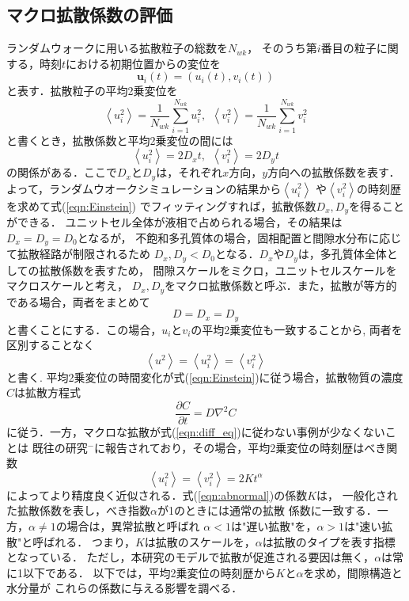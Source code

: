 \subsection{マクロ拡散係数の評価}
ランダムウォークに用いる拡散粒子の総数を$N_{wk}$，
そのうち第$i$番目の粒子に関する，時刻$t$における初期位置からの変位を
\begin{equation}
	\mathbf{u}_i(t)=\left(u_i(t),v_i(t)\right)
	\label{eqn:u_i}
\end{equation}
と表す．拡散粒子の平均2乗変位を
\begin{equation}
	\left< u_i^2 \right>=
	\frac{1}{N_{wk}} \sum_{i=1}^{N_{wk}}u_i^2
	, \ \ 
	\left< v_i^2 \right>=
	\frac{1}{N_{wk}} \sum_{i=1}^{N_{wk}}v_i^2
	\label{eqn:u2b}
\end{equation}
と書くとき，拡散係数と平均2乗変位の間には
\begin{equation}
	\left< u_i^2 \right>=2 D_{x} t, \ \ 
	\left< v_i^2 \right>=2 D_{y} t
	\label{eqn:Einstein}
\end{equation}
の関係がある．ここで$D_x$と$D_y$は，それぞれ$x$方向，$y$方向への拡散係数を表す．
よって，ランダムウオークシミュレーションの結果から$\left<u_i^2\right>$
や$\left<v_i^2\right>$の時刻歴を求めて式(\ref{eqn:Einstein})
でフィッティングすれば，拡散係数$D_x,D_y$を得ることができる．
ユニットセル全体が液相で占められる場合，その結果は$D_x=D_y=D_0$となるが，
不飽和多孔質体の場合，固相配置と間隙水分布に応じて拡散経路が制限されるため
$D_x,D_y<D_0$となる．$D_x$や$D_y$は，多孔質体全体としての拡散係数を表すため，
間隙スケールをミクロ，ユニットセルスケールをマクロスケールと考え，
$D_x,D_y$をマクロ拡散係数と呼ぶ．また，拡散が等方的である場合，両者をまとめて
\begin{equation}
	D=D_x=D_y
	\label{eqn:D_iso}
\end{equation}
と書くことにする．この場合，$u_i$と$v_i$の平均2乗変位も一致することから,
両者を区別することなく
\begin{equation}
	\left<u^2\right>
	=
	\left<u_i^2\right>
	=
	\left<v_i^2\right>
	\label{eqn:}
\end{equation}
と書く. 平均2乗変位の時間変化が式(\ref{eqn:Einstein})に従う場合，拡散物質の濃度$C$は拡散方程式
\begin{equation}
	\frac{\partial C}{\partial t}=D\nabla ^2 C
	\label{eqn:diff_eq}
\end{equation}
に従う．一方，マクロな拡散が式(\ref{eqn:diff_eq})に従わない事例が少なくないことは
既往の研究\cite{Rubin}$^-$\cite{Upscaling_review}に報告されており，その場合，平均2乗変位の時刻歴はべき関数
\begin{equation}
	\left< u_i^2 \right>=
	\left< v_i^2 \right>=2 K t^\alpha
	\label{eqn:abnormal}
\end{equation}
によってより精度良く近似される．式(\ref{eqn:abnormal})の係数$K$は，
一般化された拡散係数を表し，べき指数$\alpha$が1のときには通常の拡散
係数に一致する\cite{Rwk_textbook}．一方，$\alpha \neq 1$の場合は，異常拡散と呼ばれ
$\alpha < 1$は"遅い拡散"を，$\alpha>1$は"速い拡散"と呼ばれる．
つまり，$K$は拡散のスケールを，$\alpha$は拡散のタイプを表す指標となっている．
ただし，本研究のモデルで拡散が促進される要因は無く，$\alpha$は常に1以下である．
以下では，平均2乗変位の時刻歴から$K$と$\alpha$を求め，間隙構造と水分量が
これらの係数に与える影響を調べる．

